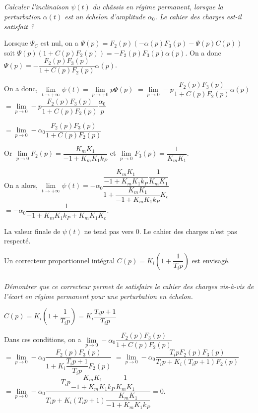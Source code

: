 \documentclass[10pt,fleqn]{article} %
\begin{document}
\subparagraph{\label{q_30}}\textit{Calculer l’inclinaison $\psi(t)$ du châssis en régime permanent, lorsque la perturbation $\alpha(t)$ est un échelon d’amplitude $\alpha_0$. Le cahier des charges est-il satisfait ?}
\ifprof
\begin{corrige}
Lorsque $\Psi_C$ est nul, on a $\Psi (p)=F_2(p)\left( -\alpha(p) F_3(p)-\Psi(p) C(p) \right)$
soit $\Psi (p)\left(1+C(p)F_2(p)\right)=-F_2(p)  F_3(p) \alpha(p) $. On a donc
$\Psi (p)=-\dfrac{F_2(p)  F_3(p)}{1+C(p)F_2(p)} \alpha(p) $.

On a donc, $\lim\limits_{t \to +\infty} \psi (t) =\lim\limits_{p \to +0} p \Psi (p)$
$=\lim\limits_{p \to 0}  -p\dfrac{F_2(p)  F_3(p)}{1+C(p)F_2(p)} \alpha(p)$
$=\lim\limits_{p \to 0} -p\dfrac{F_2(p)  F_3(p)}{1+C(p)F_2(p)} \dfrac{\alpha_0}{p}$

$=\lim\limits_{p \to 0} -\alpha_0\dfrac{F_2(p)  F_3(p)}{1+C(p)F_2(p)} $

Or $\lim\limits_{p \to 0} F_2(p) =\dfrac{K_m K_1}{-1+K_m K_1k_P}$ et 
$\lim\limits_{p \to 0} F_3(p) =\dfrac{1}{K_mK_1}$.

On a  alors, 
$\lim\limits_{t \to +\infty} \psi (t) = -\alpha_0\dfrac{\dfrac{K_m K_1}{-1+K_m K_1k_P}\dfrac{1}{K_mK_1}}{1+\dfrac{K_m K_1}{-1+K_m K_1k_P} K_c}$
$= -\alpha_0\dfrac{1}{-1+K_m K_1k_P+K_m K_1 K_c}$.

La valeur finale de $\psi(t)$ ne tend pas vers 0. Le cahier des charges n'est pas respecté.


\end{corrige}
\else
\fi

Un correcteur proportionnel intégral $C(p)=K_i \left(1+\dfrac{1}{T_i p}\right)$ est envisagé.

\subparagraph{\label{q_31}}\textit{Démontrer que ce correcteur permet de satisfaire le cahier des charges  vis-à-vis de l’écart en régime permanent pour une perturbation en échelon.}
\ifprof
\begin{corrige}
$C(p)=K_i \left(1+\dfrac{1}{T_i p}\right) = K_i \dfrac{T_i p+1}{T_i p}$

Dans ces conditions, on a 
$\lim\limits_{p \to 0} -\alpha_0\dfrac{F_2(p)  F_3(p)}{1+C(p)F_2(p)} $
$ = \lim\limits_{p \to 0} -\alpha_0\dfrac{F_2(p)  F_3(p)}{1+K_i \dfrac{T_i p+1}{T_i p}F_2(p)} $
$ = \lim\limits_{p \to 0} -\alpha_0\dfrac{T_i p F_2(p)  F_3(p)}{T_i p+K_i \left(T_i p+1\right)F_2(p)} $
$ = \lim\limits_{p \to 0} -\alpha_0\dfrac{T_i p \dfrac{K_m K_1}{-1+K_m K_1k_P}  \dfrac{1}{K_mK_1}}{T_i p+K_i \left(T_i p+1\right)\dfrac{K_m K_1}{-1+K_m K_1k_P}}  = 0$.
\end{corrige}
\else
\fi
\end{document}
